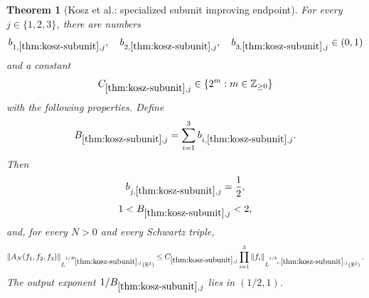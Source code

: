 \documentclass[11pt]{article}
\newtheorem{theorem}{Theorem}[section]
\newcommand{\R}{\mathbb{R}}
\newcommand{\norm}[2]{\left\lVert #1\right\rVert_{#2}}
\newcommand{\Cst}[2]{C_{\ref{#1},#2}}
\newcommand{\set}[1]{\left\{#1\right\}}
\newcommand{\indices}{\{1,2,3\}}
\begin{document}
	\begin{theorem}[Kosz et al.: specialized subunit improving endpoint]\label{thm:kosz-subunit}
		For every \(j\in\indices\), there are numbers
		\[
		b_{1,\ref{thm:kosz-subunit},j},
		\quad
		b_{2,\ref{thm:kosz-subunit},j},
		\quad
		b_{3,\ref{thm:kosz-subunit},j}
		\in(0,1)
		\]
		and a constant
		\[
		\Cst{thm:kosz-subunit}{j}\in\set{2^m:m\in\mathbb Z_{\geq0}}
		\]
		with the following properties.  Define
		\[
		B_{\ref{thm:kosz-subunit},j}
		=
		\sum_{i=1}^{3}b_{i,\ref{thm:kosz-subunit},j}.
		\]
		Then
		\[
		b_{j,\ref{thm:kosz-subunit},j}=\frac12,
		\]
		\[
		1<B_{\ref{thm:kosz-subunit},j}<2,
		\]
		and, for every \(N>0\) and every Schwartz triple,
		\[
		\norm{A_N(f_1,f_2,f_3)}{L^{1/B_{\ref{thm:kosz-subunit},j}}(\R^3)}
		\leq
		\Cst{thm:kosz-subunit}{j}
		\prod_{i=1}^{3}
		\norm{f_i}{L^{1/b_{i,\ref{thm:kosz-subunit},j}}(\R^3)}.
		\]
		The output exponent \(1/B_{\ref{thm:kosz-subunit},j}\) lies in \((1/2,1)\).
	\end{theorem}
	
\end{document}
